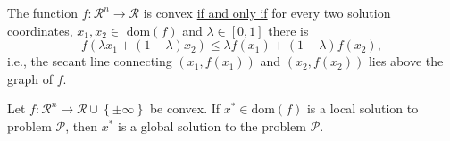 \begin{lem}
    The function $f : \mathcal{R}^{n}\rightarrow\mathcal{R}$ is convex \underline{if and only if} for every two solution coordinates, $x_{1},x_{2}\in\text{ dom}(f)$ and $\lambda\in\left[0,1\right]$ there is
       \begin{displaymath}
          f\left(\lambda x_{1} +\left(1-\lambda\right)x_{2}\right) \le \lambda f\left(x_{1}\right) + \left(1 - \lambda\right)f\left(x_{2}\right),
       \end{displaymath}
i.e., the secant line connecting $\left(x_{1},f\left(x_{1}\right)\right)$ and $\left(x_{2},f\left(x_{2}\right)\right)$ lies above the graph of $f$.
\end{lem}


\begin{thm}\label{Theorem_Convex1}
   Let $f:\mathcal{R}^{n}\rightarrow\mathcal{R}\cup\left\{\pm\infty\right\}$ be convex. If $x^{\ast}\in\text{dom}(f)$ is a local solution to problem $\mathcal{P}$, then $x^{\ast}$ is a global solution to the problem $\mathcal{P}$.
\end{thm}

